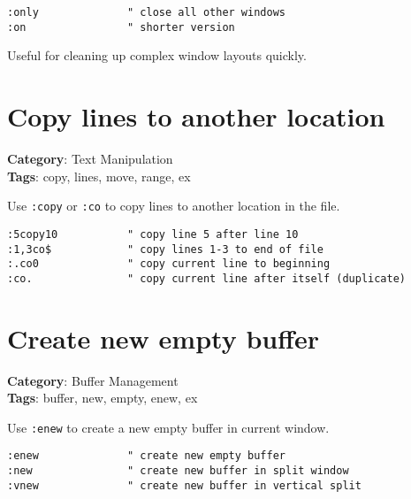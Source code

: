 {{{{{{\begin{Exa*}{}
\begin{Verbatim}[fontsize=\footnotesize, breaklines, breakanywhere]
:only              " close all other windows
:on                " shorter version
\end{Verbatim}
\end{Exa*}

Useful for cleaning up complex window layouts quickly.

\section{Copy lines to another location}

\textbf{Category}: Text Manipulation\\ \textbf{Tags}: copy, lines, move, range, ex
\vspace{0.5cm}

Use {\footnotesize \Verb§:copy§} or {\footnotesize \Verb§:co§} to copy lines to another location in the file.

\begin{Exa*}{}
\begin{Verbatim}[fontsize=\footnotesize, breaklines, breakanywhere]
:5copy10           " copy line 5 after line 10
:1,3co$            " copy lines 1-3 to end of file
:.co0              " copy current line to beginning
:co.               " copy current line after itself (duplicate)
\end{Verbatim}
\end{Exa*}

\section{Create new empty buffer}

\textbf{Category}: Buffer Management\\ \textbf{Tags}: buffer, new, empty, enew, ex
\vspace{0.5cm}

Use {\footnotesize \Verb§:enew§} to create a new empty buffer in current window.

\begin{Exa*}{}
\begin{Verbatim}[fontsize=\footnotesize, breaklines, breakanywhere]
:enew              " create new empty buffer
:new               " create new buffer in split window
:vnew              " create new buffer in vertical split
\end{Verbatim}
\end{Exa*}

}}}}}}
